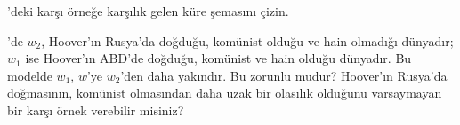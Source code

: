 \documentclass[../../../include/open-logic-section]{subfiles}
\begin{document}
\begin{prob}
'deki karşı örneğe karşılık gelen
küre şemasını çizin.
\end{prob}

\begin{prob}
  'de $w_2$, Hoover'ın Rusya'da
  doğduğu, komünist olduğu ve hain olmadığı dünyadır; $w_1$ ise Hoover'ın
  ABD'de doğduğu, komünist ve hain olduğu dünyadır. Bu modelde $w_1$, $w$'ye
  $w_2$'den daha yakındır. Bu zorunlu mudur? Hoover'ın Rusya'da doğmasının,
  komünist olmasından daha uzak bir olasılık olduğunu varsaymayan bir karşı
  örnek verebilir misiniz?
\end{prob}
\end{document}
